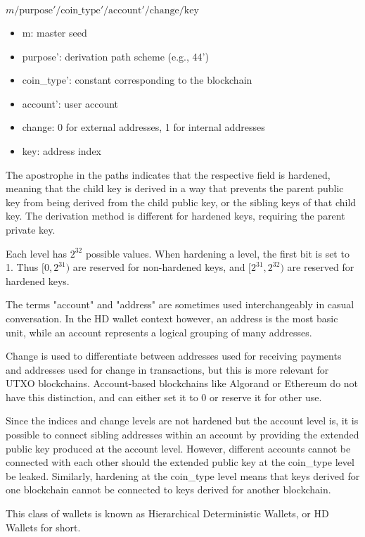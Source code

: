 \documentclass[12pt, a4paper, twocolumn]{article}
\begin{document}
$m / \text{purpose}' / \text{coin\_type}' / \text{account}' / \text{change} / \text{key}$

\begin{itemize}[label=\textendash, itemsep=-0.5em]
  \item m: master seed
  \item purpose': derivation path scheme (e.g., 44')
  \item coin\_type': constant corresponding to the blockchain
  \item account': user account
  \item change: 0 for external addresses, 1 for internal addresses
  \item key: address index
\end{itemize}

The apostrophe in the paths indicates that the respective field is hardened, meaning that the child key is derived in a way that prevents the parent public key from being derived from the child public key, or the sibling keys of that child key. The derivation method is different for hardened keys, requiring the parent private key.

Each level has $2^{32}$ possible values. When hardening a level, the first bit is set to 1. Thus $[0, 2^{31})$ are reserved for non-hardened keys, and $[2^{31}, 2^{32})$ are reserved for hardened keys.

The terms "account" and "address" are sometimes used interchangeably in casual conversation. In the HD wallet context however, an address is the most basic unit, while an account represents a logical grouping of many addresses. 

Change is used to differentiate between addresses used for receiving payments and addresses used for change in transactions, but this is more relevant for UTXO blockchains. Account-based blockchains like Algorand or Ethereum do not have this distinction, and can either set it to 0 or reserve it for other use.

Since the indices and change levels are not hardened but the account level is, it is possible to connect sibling addresses within an account by providing the extended public key produced at the account level. However, different accounts cannot be connected with each other should the extended public key at the coin\_type level be leaked. Similarly, hardening at the coin\_type level means that keys derived for one blockchain cannot be connected to keys derived for another blockchain.

This class of wallets is known as Hierarchical Deterministic Wallets, or HD Wallets for short.
\end{document}
